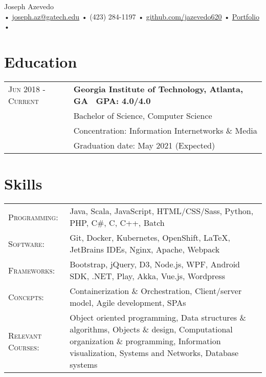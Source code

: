 \documentclass[a4paper,11pt]{article}
\newenvironment{rsection}[1]
  {
    \section{#1}
    \begin{tabular}{>{\raggedleft\arraybackslash}p{3.7cm}|p{14.7cm}}
   } {
    \end{tabular}
  }
\newcommand{\rheader}[2]{
  \textsc{#1} & \textbf{#2}
}
\newcommand{\rline}[1]{\\& #1}
\newcommand{\ritem}[2][ • ]{\\[-2pt]& \footnotesize{#1#2}}
\newenvironment{rskills}[1][Skills]
  {
    \section{#1}
    \begin{tabular}{>{\raggedleft\arraybackslash}p{3.7cm}p{14.7cm}}
    } {
    \end{tabular}
  }
\newcommand{\rskill}[2]{\textsc{#1}:& #2 \\}
\begin{document}
\hsize=7.5in \vsize=11in
\hoffset=-0.65in \voffset=-0.4in
\pdfpagewidth=8.5in
\pdfpageheight=11in
\pagestyle{empty}


\begin{center}
     \Huge       Joseph Azevedo
  \\ \normalsize • \href{mailto:joseph.az@gatech.edu}{joseph.az@gatech.edu} • (423) 284-1197 •
\href{https://github.com/jazevedo620}{github.com/jazevedo620} • \href{https://jazevedo.me}{Portfolio} • \\[6pt]
\end{center}
\vspace{-4pt}


\begin{rsection}{Education}
  \rheader{Jun 2018 - Current}{Georgia Institute of Technology{\normalfont, Atlanta, GA \dotfill\  GPA: 4.0/4.0}}
  \rline{Bachelor of Science, Computer Science}
  \vspace{2pt}
  \ritem[]{Concentration: Information Internetworks \& Media}
  \ritem[]{Graduation date: May 2021 (Expected)}
\end{rsection}
\vspace{-9pt}


\begin{rskills}
  \rskill{Programming}      {Java, Scala, JavaScript, HTML/CSS/Sass, Python, PHP, C\#, C, C++, Batch}
  \rskill{Software}         {Git, Docker, Kubernetes, OpenShift, \LaTeX, JetBrains IDEs, Nginx, Apache, Webpack}
  \rskill{Frameworks}       {Bootstrap, jQuery, D3, Node.js, WPF, Android SDK, .NET, Play, Akka, Vue.js, Wordpress}
  \rskill{Concepts}         {Containerization \& Orchestration,  Client/server model, Agile development, SPAs}
  \rskill{Relevant Courses} {Object oriented programming, Data structures \& algorithms, Objects \& design,
Computational organization \& programming, Information visualization, Systems and Networks, Database systems}
\end{rskills}
\vspace{-8pt}
\end{document}
